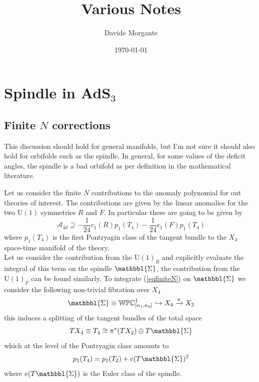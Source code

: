 \documentclass[11pt]{article}
\title{\vspace{1cm}\bf{Various Notes}\vspace{0.2cm}}
\date{\vspace{0.2cm} \today}
\author{Davide Morgante}
\theoremstyle{definition}
\numberwithin{equation}{section}
\newcommand{\Spindle}{\mathbbl{\Sigma}}
\newcommand*\U{\mathrm{U}}
\begin{document}
\allowdisplaybreaks
\maketitle

\setcounter{page}{1}
{\hypersetup{linkcolor=black}
\tableofcontents
}

\section{Spindle in AdS$_{3}$}
\subsection{Finite $N$ corrections}
This discussion should hold for general manifolds, but I'm not sure it should also hold for orbifolds such as the spindle. In general, for some values of the deficit angles, the spindle is a bad orbifold as per definition in the mathematical literature.

Let us consider the finite $N$ contributions to the anomaly polynomial for out theories of interest. The contributions are given by the linear anomalies for the two $\U(1)$ symmetries $R$ and $F$. In particular these are going to be given by
\begin{equation}
	\mathcal{A}_{4d}\supseteq -\frac{1}{24}c_{1}(R)p_{1}(T_{4})-\frac{1}{24}c_{1}(F)p_{1}(T_{4}) 
	\label{eqfiniteN}
\end{equation}
where $p_{1}(T_{4})$ is the first Pontryagin class of the tangent bundle to the $X_{4}$ space-time manifold of the theory.\\
Let us consider the contribution from the $\U(1)_{R}$ and explicitly evaluate the integral of this term on the spindle $\Spindle$, the contribution from the $\U(1)_{F}$ can be found similarly. To integrate (\ref{eqfiniteN}) on $\Spindle$ we consider the following non-trivial fibration over $X_{4}$ 
\begin{equation}
	\Spindle\equiv\mathbb{WPC}^{1}_{[n_{1},n_{2}]}\hookrightarrow X_{4}\xrightarrow{\pi} X_{2}
\end{equation}
this induces a splitting of the tangent bundles of the total space 
\begin{equation}
	TX_{4}\equiv T_{4}\cong \pi^{*}(TX_{2})\oplus T\Spindle
\end{equation}
which at the level of the Pontryagin class amounts to
\begin{equation}
	p_{1}(T_{4})=p_{1}(T_{2})+e(T\Spindle)^{2}
	\label{eqpontry}
\end{equation}
where $e(T\Spindle)$ is the Euler class of the spindle.
\end{document}
